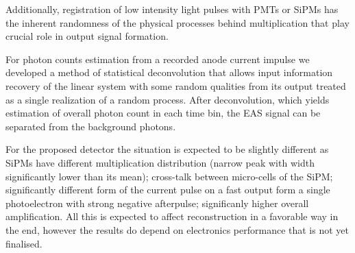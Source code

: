 \documentclass[a4paper,11pt]{article}
\begin{document}


Additionally, registration of low intensity light pulses with PMTs or SiPMs has the inherent randomness of the physical processes behind multiplication that play crucial role in output signal formation. %

For photon counts estimation from a recorded anode current impulse we developed a method of statistical deconvolution that allows input information recovery of the linear system with some random qualities from its output treated as a single realization of a random process. After deconvolution, which yields estimation of overall photon count in each time bin, the EAS signal can be separated from the background photons.

For the proposed detector the situation is expected to be slightly different as SiPMs have different multiplication distribution (narrow peak with width significantly lower than its mean); cross-talk between micro-cells of the SiPM; significantly different form of the current pulse on a fast output form a single photoelectron with strong negative afterpulse; significanly higher overall amplification. All this is expected to affect reconstruction in a favorable way in the end, however the results do depend on electronics performance that is not yet finalised.
\end{document}
